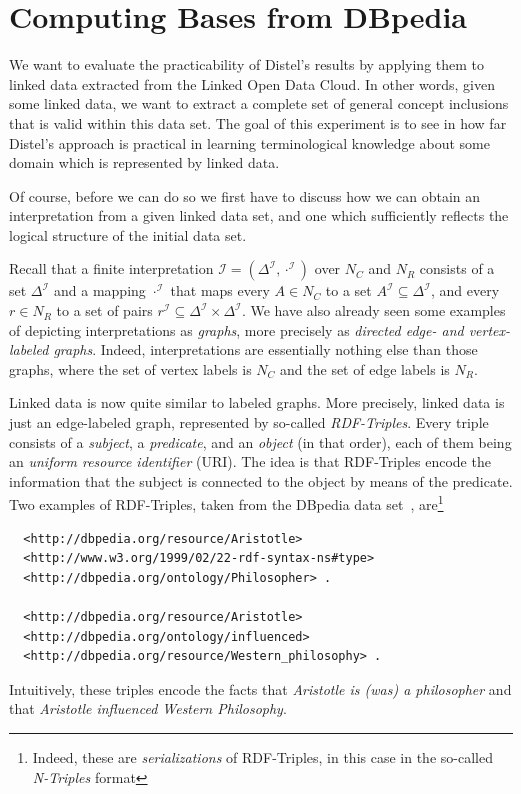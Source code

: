 \section{Computing Bases from DBpedia}
\label{sec:computing-bases-from}

We want to evaluate the practicability of Distel's results by applying them to linked data
extracted from the Linked Open Data Cloud.  In other words, given some linked data, we
want to extract a complete set of general concept inclusions that is valid within this
data set.  The goal of this experiment is to see in how far Distel's approach is practical
in learning terminological knowledge about some domain which is represented by linked data.

Of course, before we can do so we first have to discuss how we can obtain an
interpretation from a given linked data set, and one which sufficiently reflects the
logical structure of the initial data set.

Recall that a finite interpretation $\mathcal{I} = (\Delta^{\mathcal{I}},
\cdot^{\mathcal{I}})$ over $N_C$ and $N_R$ consists of a set $\Delta^{\mathcal{I}}$ and a
mapping $\cdot^{\mathcal{I}}$ that maps every $A \in N_C$ to a set $A^{\mathcal{I}}
\subseteq \Delta^{\mathcal{I}}$, and every $r \in N_R$ to a set of pairs $r^{\mathcal{I}}
\subseteq \Delta^{\mathcal{I}} \times \Delta^{\mathcal{I}}$.  We have also already seen
some examples of depicting interpretations as \emph{graphs}, more precisely as
\emph{directed edge- and vertex-labeled graphs}.  Indeed, interpretations are essentially
nothing else than those graphs, where the set of vertex labels is $N_C$ and the set of
edge labels is $N_R$.

Linked data is now quite similar to labeled graphs.  More precisely, linked data is just
an edge-labeled graph, represented by so-called \emph{RDF-Triples}.  Every triple consists
of a \emph{subject}, a \emph{predicate}, and an \emph{object} (in that order), each of
them being an \emph{uniform resource identifier} (URI).  The idea is that RDF-Triples
encode the information that the subject is connected to the object by means of the
predicate.  Two examples of RDF-Triples, taken from the DBpedia data set~\cite{DBpedia},
are\footnote{Indeed, these are \emph{serializations} of RDF-Triples, in this case in the
  so-called \emph{N-Triples} format}
\begin{verbatim}
  <http://dbpedia.org/resource/Aristotle>
  <http://www.w3.org/1999/02/22-rdf-syntax-ns#type>
  <http://dbpedia.org/ontology/Philosopher> .

  <http://dbpedia.org/resource/Aristotle>
  <http://dbpedia.org/ontology/influenced>
  <http://dbpedia.org/resource/Western_philosophy> .
\end{verbatim}
Intuitively, these triples encode the facts that \emph{Aristotle is (was) a philosopher}
and that \emph{Aristotle influenced Western Philosophy}.

